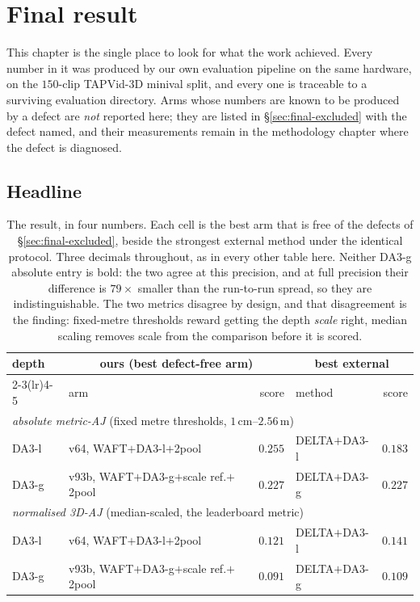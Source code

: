 \documentclass[11pt,a4paper]{article}
\begin{document}
\section{Final result}
\label{sec:final}

This chapter is the single place to look for what the work achieved. Every number in it was
produced by our own evaluation pipeline on the same hardware, on the $150$-clip TAPVid-3D
minival split, and every one is traceable to a surviving evaluation directory. Arms whose
numbers are known to be produced by a defect are \emph{not} reported here; they are listed in
\S\ref{sec:final-excluded} with the defect named, and their measurements remain in the
methodology chapter where the defect is diagnosed.

\subsection{Headline}
\label{sec:final-headline}

\begin{table}[h]
\centering
\caption{The result, in four numbers. Each cell is the best arm that is free of the defects of
\S\ref{sec:final-excluded}, beside the strongest external method under the identical protocol.
Three decimals throughout, as in every other table here. Neither DA3-g absolute entry is bold: the
two agree at this precision, and at full precision their difference is $79\times$ smaller than the
run-to-run spread, so they are indistinguishable.
The two metrics disagree by design, and that disagreement is the finding: fixed-metre thresholds
reward getting the depth \emph{scale} right, median scaling removes scale from the comparison
before it is scored.}
\label{tab:final-headline}
\begin{tabular}{llrlr}
\toprule
depth & \multicolumn{2}{c}{ours (best defect-free arm)} & \multicolumn{2}{c}{best external} \\
\cmidrule(lr){2-3}\cmidrule(lr){4-5}
 & arm & score & method & score \\
\midrule
\multicolumn{5}{l}{\emph{absolute metric-AJ} (fixed metre thresholds, $1$\,cm--$2.56$\,m)} \\
DA3-l & v64, WAFT$+$DA3-l$+$2pool & $\mathbf{0.255}$ & DELTA$+$DA3-l & $0.183$ \\
DA3-g & v93b, WAFT$+$DA3-g$+$scale ref.$+$2pool & $0.227$ & DELTA$+$DA3-g & $0.227$ \\
\midrule
\multicolumn{5}{l}{\emph{normalised 3D-AJ} (median-scaled, the leaderboard metric)} \\
DA3-l & v64, WAFT$+$DA3-l$+$2pool & $0.121$ & DELTA$+$DA3-l & $\mathbf{0.141}$ \\
DA3-g & v93b, WAFT$+$DA3-g$+$scale ref.$+$2pool & $0.091$ & DELTA$+$DA3-g & $\mathbf{0.109}$ \\
\bottomrule
\end{tabular}
\end{table}
\end{document}
